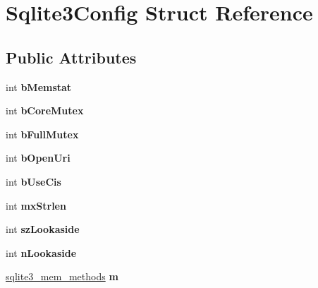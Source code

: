 \hypertarget{struct_sqlite3_config}{\section{Sqlite3\-Config Struct Reference}
\label{struct_sqlite3_config}
}
\subsection*{Public Attributes}
\begin{DoxyCompactItemize}
\item 
\hypertarget{struct_sqlite3_config_aae01de5f37a66422f2a7413e108e03fe}{int {\bfseries b\-Memstat}}\label{struct_sqlite3_config_aae01de5f37a66422f2a7413e108e03fe}

\item 
\hypertarget{struct_sqlite3_config_a202216a82e0823d0a4629c4884215a54}{int {\bfseries b\-Core\-Mutex}}\label{struct_sqlite3_config_a202216a82e0823d0a4629c4884215a54}

\item 
\hypertarget{struct_sqlite3_config_aab880bf54370cd0f6210afce0fb646ee}{int {\bfseries b\-Full\-Mutex}}\label{struct_sqlite3_config_aab880bf54370cd0f6210afce0fb646ee}

\item 
\hypertarget{struct_sqlite3_config_af446c9f0657e5564b4dbba3421ffc8be}{int {\bfseries b\-Open\-Uri}}\label{struct_sqlite3_config_af446c9f0657e5564b4dbba3421ffc8be}

\item 
\hypertarget{struct_sqlite3_config_a3eb3eb5fe14358aba2a6e0083f29d807}{int {\bfseries b\-Use\-Cis}}\label{struct_sqlite3_config_a3eb3eb5fe14358aba2a6e0083f29d807}

\item 
\hypertarget{struct_sqlite3_config_a66f1f85ec9b7724f7fe0bebad61a634f}{int {\bfseries mx\-Strlen}}\label{struct_sqlite3_config_a66f1f85ec9b7724f7fe0bebad61a634f}

\item 
\hypertarget{struct_sqlite3_config_ad7504c4c1867db9837b40d7c22ba7582}{int {\bfseries sz\-Lookaside}}\label{struct_sqlite3_config_ad7504c4c1867db9837b40d7c22ba7582}

\item 
\hypertarget{struct_sqlite3_config_a2519388eb9688eb3dbdc9b279ee73e0a}{int {\bfseries n\-Lookaside}}\label{struct_sqlite3_config_a2519388eb9688eb3dbdc9b279ee73e0a}

\item 
\hypertarget{struct_sqlite3_config_a922ec99508e346db8e4fbaec58aa1ff9}{\hyperlink{structsqlite3__mem__methods}{sqlite3\-\_\-mem\-\_\-methods} {\bfseries m}}\label{struct_sqlite3_config_a922ec99508e346db8e4fbaec58aa1ff9}


\end{DoxyCompactItemize}
